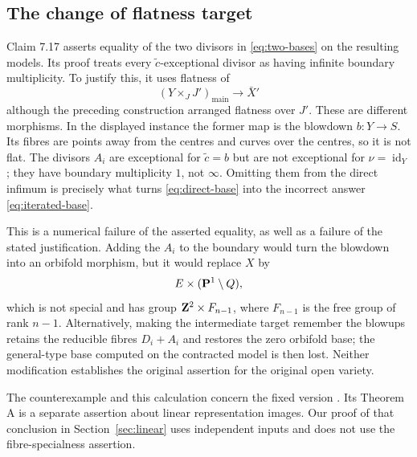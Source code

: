 \subsection{The change of flatness target}
Claim 7.17 asserts equality of the two divisors in
\eqref{eq:two-bases} on the resulting models. Its proof treats every
$\widetilde c$-exceptional divisor as having infinite boundary
multiplicity. To justify this, it uses flatness of
\[
 (Y\times_JJ')_{\mathrm{main}}\longrightarrow\bar X'
\]
although the preceding construction arranged flatness over $J'$.
These are different morphisms. In the displayed instance the former
map is the blowdown $b:Y\to S$. Its fibres are points away from the
centres and curves over the centres, so it is not flat. The divisors
$A_i$ are exceptional for $\widetilde c=b$ but are not exceptional for
$\nu=\operatorname{id}_Y$; they have boundary multiplicity $1$, not
$\infty$. Omitting them from the direct infimum is precisely what turns
\eqref{eq:direct-base} into the incorrect answer
\eqref{eq:iterated-base}.

This is a numerical failure of the asserted equality, as well as a
failure of the stated justification. Adding the $A_i$ to the boundary
would turn the blowdown into an orbifold morphism, but it would replace
$X$ by
\[
 E\times(\mathbf P^1\setminus Q),
\]
which is not special and has group $\mathbf Z^2\times F_{n-1}$, where
$F_{n-1}$ is the free group of rank $n-1$.
Alternatively, making the intermediate target remember the blowups
retains the reducible fibres $D_i+A_i$ and restores the zero orbifold
base; the general-type base computed on the contracted model is then
lost. Neither modification establishes the original assertion for
the original open variety.

The counterexample and this calculation concern the fixed version
\cite{CDHP2026}. Its Theorem A is a separate assertion about linear
representation images. Our proof of that conclusion in
Section~\ref{sec:linear} uses independent inputs and does not use the
fibre-specialness assertion.

